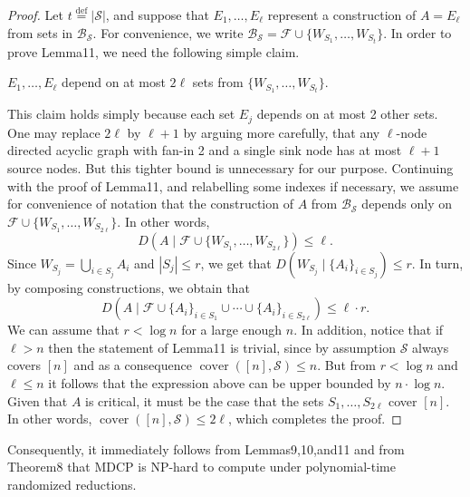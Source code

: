 \begin{proof}
Let $t\stackrel{\mathrm{def}}=|\mathcal S|$, and suppose that $E_1,\ldots,E_\ell$ represent a construction of $A=E_\ell$ from sets in $\mathcal B_{\mathcal S}$. For convenience, we write $\mathcal B_{\mathcal S}=\mathcal F\cup\{W_{S_1},\ldots,W_{S_t}\}$. In order to prove Lemma11, we need the following simple claim.
\begin{ntclaim}
$E_1,\ldots,E_\ell$ depend on at most $2\ell$ sets from $\{W_{S_1},\ldots,W_{S_t}\}$.
\end{ntclaim}
This claim holds simply because each set $E_j$ depends on at most 2 other sets. One may replace $2\ell$ by $\ell+1$ by arguing more carefully, that any $\ell$-node directed acyclic graph with fan-in 2 and a single sink node has at most $\ell+1$ source nodes. But this tighter bound is unnecessary for our purpose.
Continuing with the proof of Lemma11, and relabelling some indexes if necessary, we assume for convenience of notation that the construction of $A$ from $\mathcal B_{\mathcal S}$ depends only on $\mathcal F\cup\{W_{S_1},\ldots,W_{S_{2\ell}}\}$. In other words,
\[D(A\mid\mathcal F\cup\{W_{S_1},\ldots,W_{S_{2\ell}}\})\leq\ell.\]
Since $W_{S_j}=\bigcup_{i\in S_j}A_i$ and $|S_j|\leq r$, we get that $D(W_{S_j}\mid\{A_i\}_{i\in S_j})\leq r$. In turn, by composing constructions, we obtain that
\[D(A\mid\mathcal F\cup\{A_i\}_{i\in S_1}\cup\cdots\cup\{A_i\}_{i\in S_{2\ell}})\leq\ell\cdot r.\]
We can assume that $r<\log n$ for a large enough $n$. In addition, notice that if $\ell>n$ then the statement of Lemma11 is trivial, since by assumption $\mathcal S$ always covers $[n]$ and as a consequence $\operatorname{cover}([n],\mathcal S)\leq n$. But from $r<\log n$ and $\ell\leq n$ it follows that the expression above can be upper bounded by $n\cdot\log n$. Given that $A$ is critical, it must be the case that the sets $S_1,\ldots,S_{2\ell}$ cover $[n]$. In other words, $\operatorname{cover}([n],\mathcal S)\leq2\ell$, which completes the proof.
\end{proof}
Consequently, it immediately follows from Lemmas9,10,and11 and from Theorem8 that MDCP is NP-hard to compute under polynomial-time randomized reductions.
